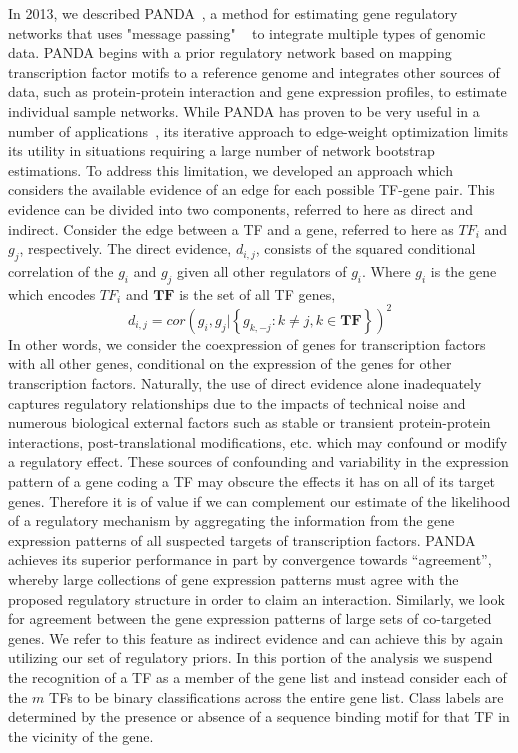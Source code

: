 \documentclass[9pt,twocolumn,twoside]{pnas-new}
\begin{document}
In 2013, we described PANDA~\cite{glass2013passing}, a method for estimating gene regulatory networks that uses "message
passing" ~\cite{frey2007clustering} to integrate
multiple types of genomic data. PANDA begins with a prior regulatory
network based on mapping transcription factor motifs to a reference
genome and integrates other sources of data, such as protein-protein
interaction and gene expression profiles, to estimate individual sample
networks. While PANDA has proven to be very useful in a number of
applications~\cite{lao2015haploinsufficiency,glass2015network,glass2014sexually},
its iterative approach to edge-weight optimization limits its utility
in situations requiring a large number of network bootstrap estimations.
To address this limitation, we developed an approach which considers
the available evidence of an edge for each possible TF-gene pair.
This evidence can be divided into two components, referred to here
as direct and indirect. Consider the edge between a TF and a gene,
referred to here as $TF_{i}$ and $g_{j}$, respectively. The direct
evidence, $d_{i,j}$, consists of the squared conditional correlation
of the $g_{i}$ and $g_{j}$ given all other regulators of $g_{i}$.
Where $g_{i}$ is the gene which encodes $TF_{i}$ and $\mathbf{TF}$ is the set of all TF genes,
\[
d_{i,j}=cor\left(g_{i},g_{j}|\left\{ g_{k,-j}:k\ne j,k\in\mathbf{TF}\right\} \right)^{2}
\]
In other words, we consider the coexpression of genes for transcription factors with all other genes, conditional on the expression of the genes for other transcription factors. Naturally, the use of direct evidence alone inadequately captures regulatory relationships due to the impacts of technical noise and numerous biological external factors such as stable or transient protein-protein interactions, post-translational modifications, etc. which may confound or modify a regulatory effect. These sources of confounding and variability
in the expression pattern of a gene coding a TF may obscure the effects
it has on all of its target genes. Therefore it is of value if we
can complement our estimate of the likelihood of a regulatory mechanism
by aggregating the information from the gene expression patterns of
all suspected targets of transcription factors. PANDA achieves its
superior performance in part by convergence towards \textquotedblleft agreement\textquotedblright ,
whereby large collections of gene expression patterns must agree with
the proposed regulatory structure in order to claim an interaction.
Similarly, we look for agreement between the gene expression patterns
of large sets of co-targeted genes. We refer to this feature as indirect
evidence and can achieve this by again utilizing our set of regulatory
priors. In this portion of the analysis we suspend the recognition
of a TF as a member of the gene list and instead consider each of
the $m$ TFs to be binary classifications across the entire gene list.
Class labels are determined by the presence or absence of a sequence
binding motif for that TF in the vicinity of the gene.
\end{document}

